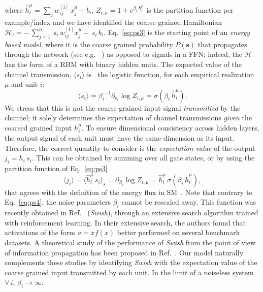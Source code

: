\documentclass{article}
\begin{document}
%
where $\hat{h}^{\mu}_i = \sum_{j} w^{[1]}_{ij} \, x^{\mu}_j + b_i $,   $Z_{i, \mu}= 1+ e^{\beta_i \, h^{\mu}_i}$ is the partition function per example/index and we have identified the coarse grained Hamiltonian $\mathscr{H}_i = -  \, \sum_{j=1}^n \, s_i \, w^{[1]}_{ij} x^{\mu}_j -  \, s_i \, b_i$. Eq.~\eqref{eq:ps3} is the starting point of an {\it energy based model}, where it is the coarse grained probability $P(\mathbf{s})$ that propagates through the network (see e.g.~\cite{connie} ) as opposed to signals in a FFN; indeed, the $\mathscr{H}$ has the form of a RBM with binary hidden units. The expected value of the channel transmission, $\langle s_i \rangle$ is~\cite{hertz} the logistic function, for each empirical realization $\mu$ and unit $i$:
%
\begin{equation} \label{eq:ps4}
\langle s_i \rangle = {\beta_i}^{-1} \partial_{b_i} \log Z_{i, \mu} =  \sigma(\beta_i \, \hat{h}^{\mu}_i).
\end{equation}
%
We stress that this is not the coarse grained input signal {\it transmitted} by the channel; it solely determines the expectation of channel transmissions {\it given} the coarsed grained input $h_i^{\mu}$. To ensure dimensional consistency across hidden layers, the output signal of each unit must have the same dimension as its input. Therefore, the correct quantity to consider is the {\it expectation value} of the output $j_i = h_i \, s_i $.  This can be  obtained by summing over all gate states, or by using the partition function of Eq.~\eqref{eq:ps3}
%
\begin{equation} \label{eq:ps5}
\langle j_i \rangle = \langle \hat{h}_i^{\mu} \, s_i \rangle_s = \partial_{\beta_i} \log{Z_{i,\mu}} = \hat{h}^{\mu}_i \, \sigma(\beta_i \, \hat{h}^{\mu}_i),
\end{equation}
%
that agrees with the definition of the energy flux in SM~\cite{bellac}. Note that contrary to Eq.~\eqref{eq:ps4}, the noise parameters $\beta_i$ cannot be rescaled away. This function was recently obtained in Ref.~\cite{prajit} ({\it Swish}), through an extensive search algorithm trained with reinforcement learning. In their extensive search, the authors found that activations of the form $a = x f(x)$  better performed on several benchmark datasets. A theoretical study of the performance of {\it Swish} from the point of view of information propagation has been proposed in Ref.~\cite{soufiane}.  Our model naturally complements these studies by identifying {\it Swish} with the expectation value of the coarse grained input transmitted by each unit. In the limit of a noiseless system $\forall \, i$, $\beta_i \to \infty $:
\end{document}
